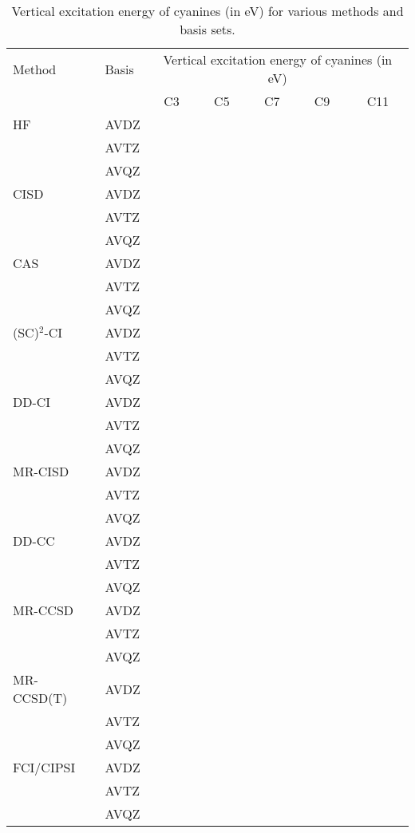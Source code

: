 \documentclass[aip,jcp,reprint,showkeys]{revtex4-1}
\newcommand{\mc}{\multicolumn}
\newcommand{\SCSC}{(SC)$^2$}
\begin{document}
\begin{table*}
	\caption{
	\label{tab:VE}
	Vertical excitation energy of cyanines (in eV) for various methods and basis sets.}
	\begin{ruledtabular}
	\begin{tabular}{llccccc}
		Method		&	Basis		&	\mc{5}{c}{Vertical excitation energy of cyanines (in eV)}	\\
										\cline{3-7}
					&				&	C3		&	C5		&	C7		&	C9		&	C11		\\
					\hline
		HF			&	AVDZ		&			&			&			&			&			\\
					&	AVTZ		&			&			&			&			&			\\
					&	AVQZ		&			&			&			&			&			\\
					\hline
		CISD		&	AVDZ		&			&			&			&			&			\\
					&	AVTZ		&			&			&			&			&			\\
					&	AVQZ		&			&			&			&			&			\\
					\hline
		CAS			&	AVDZ		&			&			&			&			&			\\
					&	AVTZ		&			&			&			&			&			\\
					&	AVQZ		&			&			&			&			&			\\
					\hline
		\SCSC-CI	&	AVDZ		&			&			&			&			&			\\
					&	AVTZ		&			&			&			&			&			\\
					&	AVQZ		&			&			&			&			&			\\
					\hline
		DD-CI		&	AVDZ		&			&			&			&			&			\\
					&	AVTZ		&			&			&			&			&			\\
					&	AVQZ		&			&			&			&			&			\\
					\hline
		MR-CISD		&	AVDZ		&			&			&			&			&			\\
					&	AVTZ		&			&			&			&			&			\\
					&	AVQZ		&			&			&			&			&			\\
					\hline
		DD-CC		&	AVDZ		&			&			&			&			&			\\
					&	AVTZ		&			&			&			&			&			\\
					&	AVQZ		&			&			&			&			&			\\
					\hline
		MR-CCSD		&	AVDZ		&			&			&			&			&			\\
					&	AVTZ		&			&			&			&			&			\\
					&	AVQZ		&			&			&			&			&			\\
					\hline
		MR-CCSD(T)	&	AVDZ		&			&			&			&			&			\\
					&	AVTZ		&			&			&			&			&			\\
					&	AVQZ		&			&			&			&			&			\\
					\hline
		FCI/CIPSI	&	AVDZ		&			&			&			&			&			\\
					&	AVTZ		&			&			&			&			&			\\
					&	AVQZ		&			&			&			&			&			\\
	\end{tabular}		
	\end{ruledtabular}		
\end{table*}		
\end{document}
